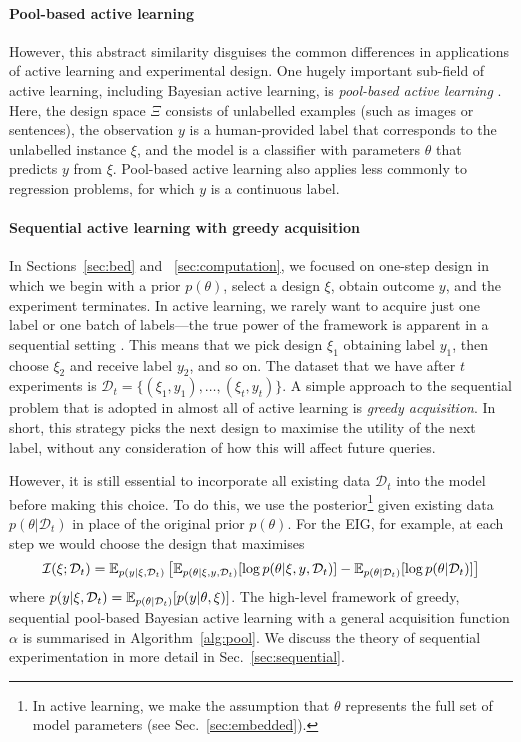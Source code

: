 \documentclass[a4paper, 10pt]{report}
\theoremstyle{plain}
\begin{document}
	\paragraph{Pool-based active learning} However, this abstract similarity disguises the common differences in applications of active learning and experimental design.
	One hugely important sub-field of active learning, including Bayesian active learning, is \emph{pool-based active learning} \citep{lewis1994sequential}.
	Here, the design space $\Xi$ consists of unlabelled examples (such as images or sentences), the observation $y$ is a human-provided label that corresponds to the unlabelled instance $\xi$, and the model is a classifier with parameters $\theta$ that predicts $y$ from $\xi$.
	Pool-based active learning also applies less commonly to regression problems, for which $y$ is a continuous label.
	
	\paragraph{Sequential active learning with greedy acquisition}
	In Sections~\ref{sec:bed} and ~\ref{sec:computation}, we focused on one-step design in which we begin with a prior $p(\theta)$, select a design $\xi$, obtain outcome $y$, and the experiment terminates.
	In active learning, we rarely want to acquire just one label or one batch of labels---the true power of the framework is apparent in a sequential setting \citep{lewis1994sequential}.
	This means that we pick design $\xi_1$ obtaining label $y_1$, then choose $\xi_2$ and receive label $y_2$, and so on.
	The dataset that we have after $t$ experiments is $\mathcal{D}_t = \{(\xi_1,y_1),\dots,(\xi_t,y_t) \}$.
	A simple approach to the sequential problem that is adopted in almost all of active learning \citep{gal2017deep} is \emph{greedy acquisition}.
	In short, this strategy picks the next design to maximise the utility of the next label, without any consideration of how this will affect future queries.
	
	However, it is still essential to incorporate all existing data $\mathcal{D}_t$ into the model before making this choice.
	To do this, we use the posterior\footnote{In active learning, we make the assumption that $\theta$ represents the full set of model parameters (see Sec.~\ref{sec:embedded}).} given existing data $p(\theta|\mathcal{D}_t)$ in place of the original prior $p(\theta)$.
	For the EIG, for example, at each step we would choose the design that maximises
	\begin{equation}
	\mathcal{I}(\xi; \mathcal{D}_t) = \mathbb{E}_{p(y|\xi,\mathcal{D}_t)}\left[ \mathbb{E}_{p(\theta|\xi,y,\mathcal{D}_t)}[\log p(\theta|\xi,y,\mathcal{D}_t)]-\mathbb{E}_{p(\theta|\mathcal{D}_t)}[\log p(\theta|\mathcal{D}_t)] \right]
	\end{equation}
	where $p(y|\xi,\mathcal{D}_t) = \mathbb{E}_{p(\theta|\mathcal{D}_t)}[p(y|\theta,\xi)]$.
	The high-level framework of greedy, sequential pool-based Bayesian active learning with a general acquisition function $\alpha$ is summarised in Algorithm~\ref{alg:pool}.
	We discuss the theory of sequential experimentation in more detail in Sec.~\ref{sec:sequential}.
	
\end{document}
